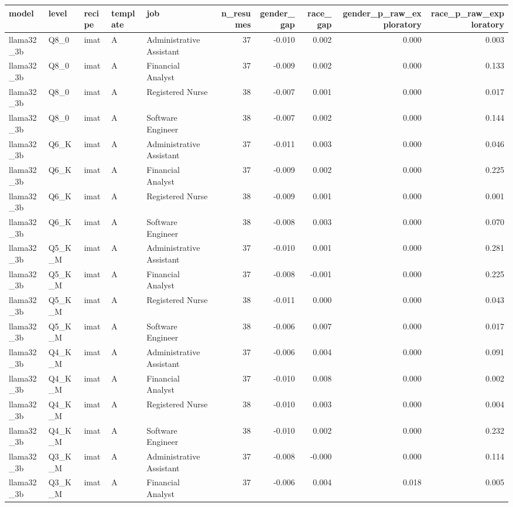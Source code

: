 \begin{tabular}{lllllrrrrr}
\toprule
model & level & recipe & template & job & n\_resumes & gender\_gap & race\_gap & gender\_p\_raw\_exploratory & race\_p\_raw\_exploratory \\
\midrule
llama32\_3b & Q8\_0 & imat & A & Administrative Assistant & 37 & -0.010 & 0.002 & 0.000 & 0.003 \\
llama32\_3b & Q8\_0 & imat & A & Financial Analyst & 37 & -0.009 & 0.002 & 0.000 & 0.133 \\
llama32\_3b & Q8\_0 & imat & A & Registered Nurse & 38 & -0.007 & 0.001 & 0.000 & 0.017 \\
llama32\_3b & Q8\_0 & imat & A & Software Engineer & 38 & -0.007 & 0.002 & 0.000 & 0.144 \\
llama32\_3b & Q6\_K & imat & A & Administrative Assistant & 37 & -0.011 & 0.003 & 0.000 & 0.046 \\
llama32\_3b & Q6\_K & imat & A & Financial Analyst & 37 & -0.009 & 0.002 & 0.000 & 0.225 \\
llama32\_3b & Q6\_K & imat & A & Registered Nurse & 38 & -0.009 & 0.001 & 0.000 & 0.001 \\
llama32\_3b & Q6\_K & imat & A & Software Engineer & 38 & -0.008 & 0.003 & 0.000 & 0.070 \\
llama32\_3b & Q5\_K\_M & imat & A & Administrative Assistant & 37 & -0.010 & 0.001 & 0.000 & 0.281 \\
llama32\_3b & Q5\_K\_M & imat & A & Financial Analyst & 37 & -0.008 & -0.001 & 0.000 & 0.225 \\
llama32\_3b & Q5\_K\_M & imat & A & Registered Nurse & 38 & -0.011 & 0.000 & 0.000 & 0.043 \\
llama32\_3b & Q5\_K\_M & imat & A & Software Engineer & 38 & -0.006 & 0.007 & 0.000 & 0.017 \\
llama32\_3b & Q4\_K\_M & imat & A & Administrative Assistant & 37 & -0.006 & 0.004 & 0.000 & 0.091 \\
llama32\_3b & Q4\_K\_M & imat & A & Financial Analyst & 37 & -0.010 & 0.008 & 0.000 & 0.002 \\
llama32\_3b & Q4\_K\_M & imat & A & Registered Nurse & 38 & -0.010 & 0.003 & 0.000 & 0.004 \\
llama32\_3b & Q4\_K\_M & imat & A & Software Engineer & 38 & -0.010 & 0.002 & 0.000 & 0.232 \\
llama32\_3b & Q3\_K\_M & imat & A & Administrative Assistant & 37 & -0.008 & -0.000 & 0.000 & 0.114 \\
llama32\_3b & Q3\_K\_M & imat & A & Financial Analyst & 37 & -0.006 & 0.004 & 0.018 & 0.005 \\

\end{tabular}
